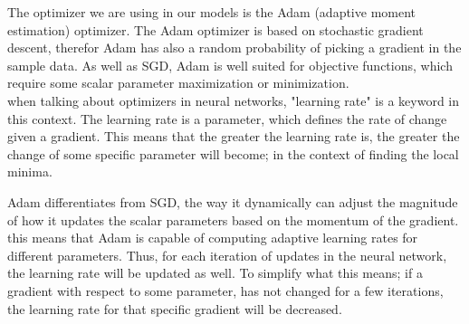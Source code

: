The optimizer we are using in our models is the Adam (adaptive moment estimation)  optimizer. The Adam optimizer is based on stochastic gradient descent\cite{adam}, therefor Adam has also a random probability of picking a gradient in the sample data. As well as SGD, Adam is well suited for objective functions, which require some scalar parameter maximization or minimization. \\

\noindent
when talking about optimizers in neural networks, "learning rate" is a keyword in this context. The learning rate is a parameter, which defines the rate of change given a gradient. This means that the greater the learning rate is, the greater the change of some specific parameter will become; in the context of finding the local minima.

\noindent
Adam differentiates from SGD, the way it dynamically can adjust the magnitude of how it updates the scalar parameters based on the momentum of the gradient. this means that Adam is capable of computing adaptive learning rates for different parameters\cite{adam}. Thus, for each iteration of updates in the neural network, the learning rate will be updated as well. To simplify what this means; if a gradient with respect to some parameter, has not changed for a few iterations, the learning rate for that specific gradient will be decreased.